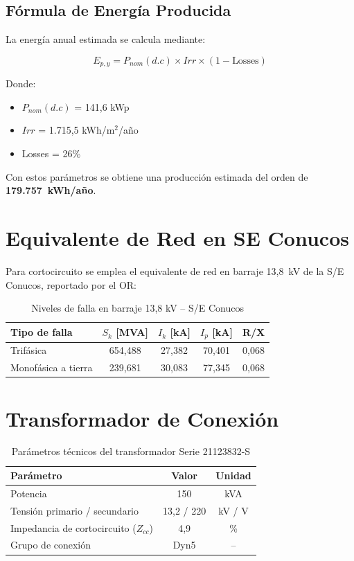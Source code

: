 \subsection{Fórmula de Energía Producida}

La energía anual estimada se calcula mediante:

\begin{equation}
E_{p,y} = P_{nom}(d.c) \times Irr \times (1 - \text{Losses})
\end{equation}

Donde:
\begin{itemize}
    \item $P_{nom}(d.c)$ = 141,6 kWp
    \item $Irr$ = 1.715,5 kWh/m$^2$/año
    \item Losses = 26\%
\end{itemize}

Con estos parámetros se obtiene una producción estimada del orden de \textbf{179.757~kWh/año}.

\section{Equivalente de Red en SE Conucos}

Para cortocircuito se emplea el equivalente de red en barraje 13,8~kV de la S/E Conucos, reportado por el OR:

\begin{table}[H]
    \centering
    \caption{Niveles de falla en barraje 13,8 kV -- S/E Conucos}
    \begin{tabular}{lcccc}
    \toprule
    \textbf{Tipo de falla} & \textbf{$S_k$ [MVA]} & \textbf{$I_k$ [kA]} & \textbf{$I_p$ [kA]} & \textbf{R/X} \\
    \midrule
    Trifásica & 654,488 & 27,382 & 70,401 & 0,068 \\
    Monofásica a tierra & 239,681 & 30,083 & 77,345 & 0,068 \\
    \bottomrule
    \end{tabular}
\end{table}

\section{Transformador de Conexión}

\begin{table}[H]
    \centering
    \caption{Parámetros técnicos del transformador Serie 21123832-S}
    \begin{tabular}{lcc}
    \toprule
    \textbf{Parámetro} & \textbf{Valor} & \textbf{Unidad} \\
    \midrule
    Potencia & 150 & kVA \\
    Tensión primario / secundario & 13,2 / 220 & kV / V \\
    Impedancia de cortocircuito ($Z_{cc}$) & 4,9 & \% \\
    Grupo de conexión & Dyn5 & -- \\
    \bottomrule
    \end{tabular}
\end{table}

